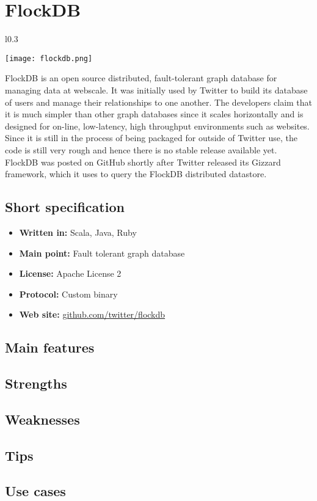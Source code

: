 \chapter{FlockDB}

\begin{wrapfigure}{l}{0.3\textwidth}
  \vspace{-75pt}
  \begin{center}
    \texttt{[image: flockdb.png]}
  \end{center}
  \vspace{-30pt}
\end{wrapfigure}
FlockDB is an open source distributed, fault-tolerant graph database for managing data at webscale. It was initially used by Twitter to build its database of users and manage their relationships to one another. The developers claim that it is much simpler than other graph databases since it scales horizontally and is designed for on-line, low-latency, high throughput environments such as websites. Since it is still in the process of being packaged for outside of Twitter use, the code is still very rough and hence there is no stable release available yet. FlockDB was posted on GitHub shortly after Twitter released its Gizzard framework, which it uses to query the FlockDB distributed datastore. 

\section{Short specification}

\begin{itemize}
  \item \textbf{Written in:} Scala, Java, Ruby
  \item \textbf{Main point:} Fault tolerant graph database
  \item \textbf{License:} Apache License 2
  \item \textbf{Protocol:} Custom binary
  \item \textbf{Web site:} \href{https://github.com/twitter/flockdb}{github.com/twitter/flockdb}
\end{itemize}

\section{Main features}

\section{Strengths}

\section{Weaknesses}

\section{Tips}

\section{Use cases}
